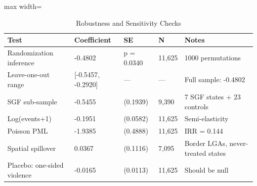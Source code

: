 \begin{table}[!h]
\centering
\caption{\label{tab:tab:robustness}Robustness and Sensitivity Checks}
\centering
\begin{adjustbox}{max width=\textwidth}
\begin{tabular}[t]{lllll}
\toprule
Test & Coefficient & SE & N & Notes\\
\midrule
Randomization inference & -0.4802 & p = 0.0340 & 11,625 & 1000 permutations\\
Leave-one-out range & {}[-0.5457, -0.2920] & --- & --- & Full sample: -0.4802\\
SGF sub-sample & -0.5455 & (0.1939) & 9,390 & 7 SGF states + 23 controls\\
Log(events+1) & -0.1951 & (0.0582) & 11,625 & Semi-elasticity\\
Poisson PML & -1.9385 & (0.4888) & 11,625 & IRR = 0.144\\
\addlinespace
Spatial spillover & 0.0367 & (0.1116) & 7,095 & Border LGAs, never-treated states\\
Placebo: one-sided violence & -0.0165 & (0.0113) & 11,625 & Should be null\\
\bottomrule
\end{tabular}
\end{adjustbox}
\end{table}

